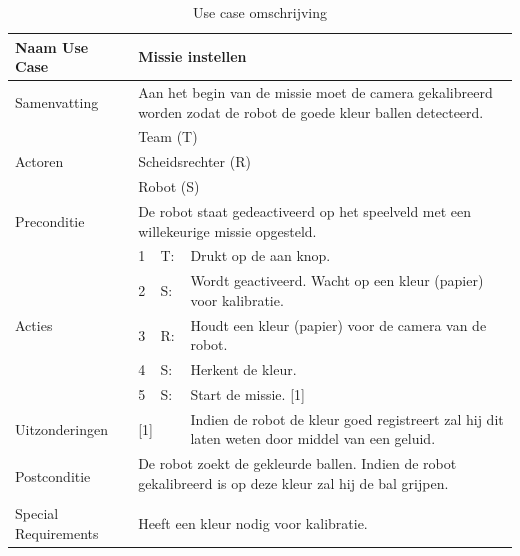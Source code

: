 \documentclass[12pt]{article} %
\begin{document}
\begin{table}[htbp]
  \centering
  \caption{Use case omschrijving}
    \begin{tabular}{llll}
    \toprule
    Naam Use Case & \multicolumn{3}{l}{\textbf{Missie instellen}} \\
    \midrule
    Samenvatting & \multicolumn{3}{l}{Aan het begin van de missie moet de camera gekalibreerd worden zodat de robot de goede kleur ballen detecteerd.} \\
    \multirow{3}[1]{*}{Actoren} & \multicolumn{3}{l}{Team (T)} \\
          & \multicolumn{3}{l}{Scheidsrechter (R)} \\
          & \multicolumn{3}{l}{Robot (S)} \\
    Preconditie & \multicolumn{3}{l}{De robot staat gedeactiveerd op het speelveld met een willekeurige missie opgesteld.} \\
    \multirow{5}[9]{*}{Acties} & 1     & T:    & Drukt op de aan knop. \\
          & 2     & S:    & Wordt geactiveerd. Wacht op een kleur (papier) voor kalibratie. \\
          & 3     & R:    & Houdt een kleur (papier) voor de camera van de robot. \\
          & 4     & S:    & Herkent de kleur. \\
          & 5     & S:    & Start de missie. [1] \\
    Uitzonderingen & \multicolumn{2}{l}{[1]} & Indien de robot de kleur goed registreert zal hij dit laten weten door middel van een geluid. \\
    \multirow{2}[1]{*}{Postconditie} & \multicolumn{3}{l}{De robot zoekt de gekleurde ballen. Indien de robot gekalibreerd is op deze kleur zal hij de bal grijpen.} \\
          & \multicolumn{3}{l}{} \\
    Special Requirements  & \multicolumn{3}{l}{Heeft een kleur nodig voor kalibratie.} \\
    \bottomrule
    \end{tabular}%
  \label{tab:addlabel}%
\end{table}%
\clearpage
\end{document}
